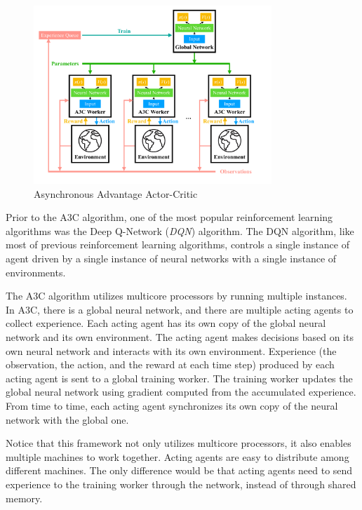        \begin{figure}[htp]
            \centering
            \includegraphics[width=0.8\textwidth]{img/a3c.pdf}
            \caption{Asynchronous Advantage Actor-Critic}
            \label{fig:a3c}
        \end{figure}

        Prior to the A3C algorithm, one of the most popular reinforcement learning algorithms was
        the Deep Q-Network (\emph{DQN}) algorithm. \cite{mnih_human-level_2015}
        The DQN algorithm, like most of previous reinforcement learning algorithms,
        controls a single instance of agent driven by a single instance of neural networks
        with a single instance of environments.

        The A3C algorithm utilizes multicore processors by running multiple instances.
        In A3C, there is a global neural network,
        and there are multiple acting agents to collect experience.
        Each acting agent has its own copy of the global neural network and its own environment.
        The acting agent makes decisions based on its own neural network and interacts with its own environment.
        Experience (the observation, the action, and the reward at each time step) produced by each acting agent
        is sent to a global training worker.
        The training worker updates the global neural network using gradient computed from the accumulated experience.
        From time to time, each acting agent synchronizes its own copy of the neural network with the global one.

        Notice that this framework not only utilizes multicore processors,
        it also enables multiple machines to work together.
        Acting agents are easy to distribute among different machines.
        The only difference would be that acting agents need to send experience to the training worker
        through the network, instead of through shared memory.

